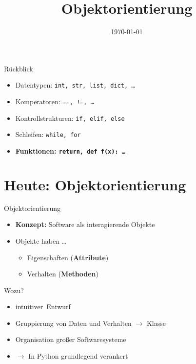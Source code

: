 



\title{Objektorientierung}
\date{\today}




\maketitle

\begin{frame}{Rückblick}
    \begin{itemize}
        \item Datentypen: \texttt{int, str, list, dict, \ldots}
        \item Komperatoren: \texttt{==, !=, \ldots}
        \item Kontrollstrukturen: \texttt{if, elif, else}
        \item Schleifen: \texttt{while, for}
        \item \textbf{\alert{Funktionen: \texttt{return, def f(x): \ldots}}}
    \end{itemize}
\end{frame}

\section{Heute: Objektorientierung}

\begin{frame}{Objektorientierung}
    \begin{itemize}
        \item \textbf{Konzept:} Software als interagierende \glqq Objekte\grqq
        \item Objekte haben \ldots
        \begin{itemize}
            \item Eigenschaften (\textbf{Attribute})
            \item Verhalten (\textbf{Methoden})
        \end{itemize}
    \end{itemize}
\end{frame}

\begin{frame}{Wozu?}
    \begin{itemize}
        \item \glqq intuitiver\grqq~Entwurf
        \item Gruppierung von Daten und Verhalten $\rightarrow$ Klasse 
        \item Organisation großer Softwaresysteme
        \item $\rightarrow$ In Python grundlegend verankert
    \end{itemize}
\end{frame}


